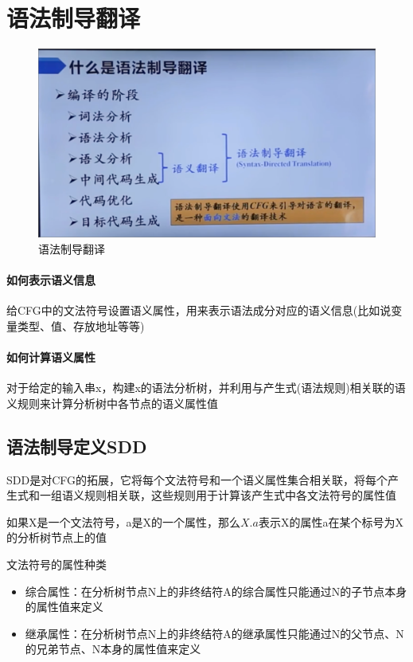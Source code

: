 \documentclass[UTF8]{ctexart} %
\begin{document}
\section{语法制导翻译}

\begin{figure}[H]
    \centering
    \includegraphics[width=\textwidth]{assets/语法制导翻译概念.png}
    \caption{语法制导翻译}
\end{figure}

\paragraph{如何表示语义信息} 给CFG中的文法符号设置语义属性，用来表示语法成分对应的语义信息(比如说变量类型、值、存放地址等等)

\paragraph{如何计算语义属性} 对于给定的输入串x，构建x的语法分析树，并利用与产生式(语法规则)相关联的语义规则来计算分析树中各节点的语义属性值

\subsection{语法制导定义SDD}

SDD是对CFG的拓展，它将每个文法符号和一个语义属性集合相关联，将每个产生式和一组语义规则相关联，这些规则用于计算该产生式中各文法符号的属性值

如果X是一个文法符号，a是X的一个属性，那么$X.a$表示X的属性a在某个标号为X的分析树节点上的值

文法符号的属性种类
\begin{itemize}
    \item 综合属性：在分析树节点N上的非终结符A的综合属性只能通过N的子节点本身的属性值来定义
    \item 继承属性：在分析树节点N上的非终结符A的继承属性只能通过N的父节点、N的兄弟节点、N本身的属性值来定义
\end{itemize}
\end{document}
